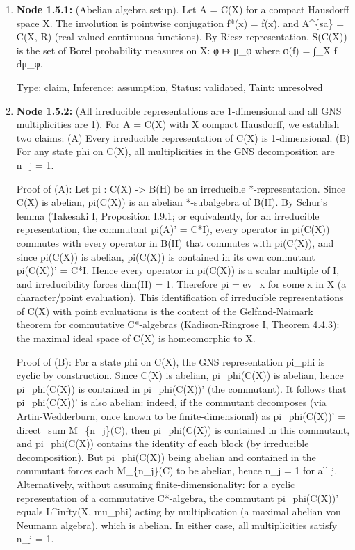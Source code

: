 \documentclass{article}
\begin{document}
\begin{enumerate}
\begin{enumerate}
\item \textbf{Node 1.5.1:} (Abelian algebra setup). Let A = C(X) for a compact Hausdorff space X. The involution is pointwise conjugation f*(x) = f(x)̄, and A\textasciicircum{}\{sa\} = C(X, R) (real-valued continuous functions). By Riesz representation, S(C(X)) is the set of Borel probability measures on X: φ ↦ μ\_φ where φ(f) = ∫\_X f dμ\_φ.

  Type: claim, Inference: assumption, Status: validated, Taint: unresolved

\item \textbf{Node 1.5.2:} (All irreducible representations are 1-dimensional and all GNS multiplicities are 1). For A = C(X) with X compact Hausdorff, we establish two claims: (A) Every irreducible representation of C(X) is 1-dimensional. (B) For any state phi on C(X), all multiplicities in the GNS decomposition are n\_j = 1.

Proof of (A): Let pi : C(X) -> B(H) be an irreducible *-representation. Since C(X) is abelian, pi(C(X)) is an abelian *-subalgebra of B(H). By Schur's lemma (Takesaki I, Proposition I.9.1; or equivalently, for an irreducible representation, the commutant pi(A)' = C*I), every operator in pi(C(X)) commutes with every operator in B(H) that commutes with pi(C(X)), and since pi(C(X)) is abelian, pi(C(X)) is contained in its own commutant pi(C(X))' = C*I. Hence every operator in pi(C(X)) is a scalar multiple of I, and irreducibility forces dim(H) = 1. Therefore pi = ev\_x for some x in X (a character/point evaluation). This identification of irreducible representations of C(X) with point evaluations is the content of the Gelfand-Naimark theorem for commutative C*-algebras (Kadison-Ringrose I, Theorem 4.4.3): the maximal ideal space of C(X) is homeomorphic to X.

Proof of (B): For a state phi on C(X), the GNS representation pi\_phi is cyclic by construction. Since C(X) is abelian, pi\_phi(C(X)) is abelian, hence pi\_phi(C(X)) is contained in pi\_phi(C(X))' (the commutant). It follows that pi\_phi(C(X))' is also abelian: indeed, if the commutant decomposes (via Artin-Wedderburn, once known to be finite-dimensional) as pi\_phi(C(X))' = direct\_sum M\_\{n\_j\}(C), then pi\_phi(C(X)) is contained in this commutant, and pi\_phi(C(X)) contains the identity of each block (by irreducible decomposition). But pi\_phi(C(X)) being abelian and contained in the commutant forces each M\_\{n\_j\}(C) to be abelian, hence n\_j = 1 for all j. Alternatively, without assuming finite-dimensionality: for a cyclic representation of a commutative C*-algebra, the commutant pi\_phi(C(X))' equals L\textasciicircum{}infty(X, mu\_phi) acting by multiplication (a maximal abelian von Neumann algebra), which is abelian. In either case, all multiplicities satisfy n\_j = 1.


\end{enumerate}
\end{enumerate}
\end{document}
